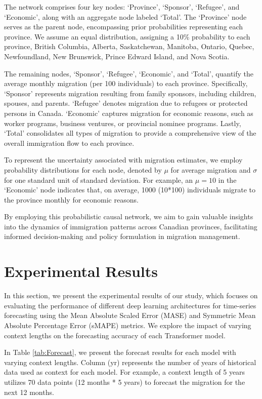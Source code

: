 \documentclass[conference]{IEEEtran}
\begin{document}
	The network comprises four key nodes: `Province', `Sponsor', `Refugee', and `Economic', along with an aggregate node labeled `Total'. The `Province' node serves as the parent node, encompassing prior probabilities representing each province. We assume an equal distribution, assigning a 10\% probability to each province, British Columbia, Alberta, Saskatchewan, Manitoba, Ontario, Quebec, Newfoundland, New Brunswick, Prince Edward Island, and Nova Scotia.
	
	The remaining nodes, `Sponsor', `Refugee', `Economic', and `Total', quantify the average monthly migration (per 100 individuals) to each province. Specifically, `Sponsor' represents migration resulting from family sponsors, including children, spouses, and parents. `Refugee' denotes migration due to refugees or protected persons in Canada. `Economic' captures migration for economic reasons, such as worker programs, business ventures, or provincial nominee programs. Lastly, `Total' consolidates all types of migration to provide a comprehensive view of the overall immigration flow to each province.
	
	To represent the uncertainty associated with migration estimates, we employ probability distributions for each node, denoted by $\mu$ for average migration and $\sigma$ for one standard unit of standard deviation. For example, an $\mu=10$ in the `Economic' node indicates that, on average, 1000 (10*100) individuals migrate to the province monthly for economic reasons.
	
	By employing this probabilistic causal network, we aim to gain valuable insights into the dynamics of immigration patterns across Canadian provinces, facilitating informed decision-making and policy formulation in migration management.
	
	
	\section{Experimental Results}
	In this section, we present the experimental results of our study, which focuses on evaluating the performance of different deep learning architectures for time-series forecasting using the Mean Absolute Scaled Error (MASE) and Symmetric Mean Absolute Percentage Error (sMAPE) metrics. We explore the impact of varying context lengths on the forecasting accuracy of each Transformer model.
	
	In Table \ref{tab:Forecast}, we present the forecast results for each model with varying context lengths. Column (yr) represents the number of years of historical data used as context for each model. For example, a context length of 5 years utilizes 70 data points (12 months * 5 years) to forecast the migration for the next 12 months.
	
\end{document}
